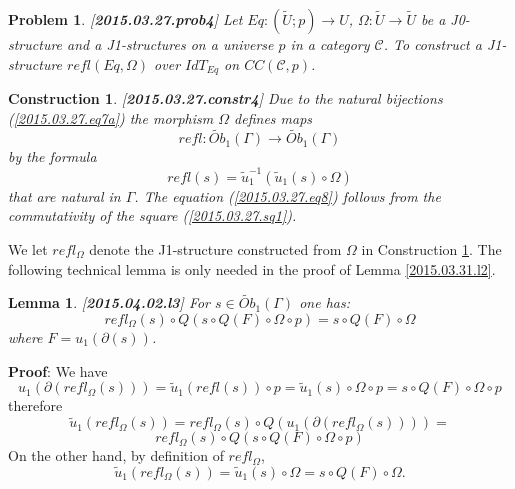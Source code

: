 \documentclass[12pt]{article}
\newenvironment{myproof}{{\bf Proof}:}{\vskip 5mm }
\newtheorem{lemma}[proposition]{Lemma}
\newtheorem{problem}[proposition]{Problem}
\newtheorem{construction}[proposition]{Construction}
\newcommand{\llabel}[1]{\label{#1}[{\bf #1}]}
\newcommand{\sr}{\rightarrow}
\newcommand{\wt}{\widetilde}
\begin{document}
%
\begin{problem}
\llabel{2015.03.27.prob4}
Let $Eq:(\wt{U};p)\sr U$, $\Omega:\wt{U}\sr \wt{U}$ be a J0-structure and a J1-structures on a universe $p$ in a category $\mathcal C$. To construct a J1-structure $refl(Eq,\Omega)$ over $IdT_{Eq}$ on $CC({\mathcal C},p)$.
\end{problem}
%
\begin{construction}\rm
\llabel{2015.03.27.constr4}
Due to the natural bijections  (\ref{2015.03.27.eq7a}) the morphism $\Omega$ defines maps
%
$$refl:\wt{Ob}_1(\Gamma)\sr \wt{Ob}_1(\Gamma)$$
%
by the formula
%
$$refl(s)=\wt{u}_1^{-1}(\wt{u}_1(s)\circ \Omega)$$
%
that are natural in $\Gamma$. The equation (\ref{2015.03.27.eq8}) follows from the commutativity of the square (\ref{2015.03.27.sq1}).
\end{construction}
%
We let $refl_{\Omega}$ denote the J1-structure constructed from $\Omega$ in Construction \ref{2015.03.27.constr4}. 
%
The following technical lemma is only needed in the proof of Lemma \ref{2015.03.31.l2}.
%
\begin{lemma}
\llabel{2015.04.02.l3}
For $s\in \wt{Ob}_1(\Gamma)$ one has:
%
$$refl_{\Omega}(s)\circ Q(s\circ Q(F)\circ \Omega\circ p)=s\circ Q(F)\circ \Omega$$
%
where $F=u_1(\partial(s))$.
\end{lemma}
%
\begin{myproof}
We have
%
$$u_1(\partial(refl_{\Omega}(s)))=\wt{u}_1(refl(s))\circ p=\wt{u}_1(s)\circ \Omega\circ p=s\circ Q(F)\circ \Omega\circ p$$
%
therefore
%
$$\wt{u}_1(refl_{\Omega}(s))=refl_{\Omega}(s)\circ Q(u_1(\partial(refl_{\Omega}(s))))=$$
$$refl_{\Omega}(s)\circ Q(s\circ Q(F)\circ \Omega\circ p)$$
%
On the other hand, by definition of $refl_{\Omega}$,
%
$$\wt{u}_1(refl_{\Omega}(s))=\wt{u}_1(s)\circ \Omega=s\circ Q(F)\circ \Omega.$$
%
\end{myproof}
\end{document}
